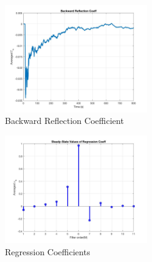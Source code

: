 \documentclass[journal]{IEEEtran}
\begin{document}
\begin{figure}[H]
  \centering
  \captionsetup{justification=centering,font = small}
  \includegraphics[width=0.55\textwidth, inner] {Plots/Project3_GAMMA_B.jpg}
  \caption{Backward Reflection Coefficient}
    \label{fig:gammab}

\end{figure}
\begin{figure}[H]
  \centering
  \captionsetup{justification=centering,font = small}
  \includegraphics[width=0.55\textwidth, inner] {Plots/Project3_STEM.jpg}
  \caption{Regression Coefficients}
    \label{fig:regcoeff}
\end{figure}

%
%
\end{document}
